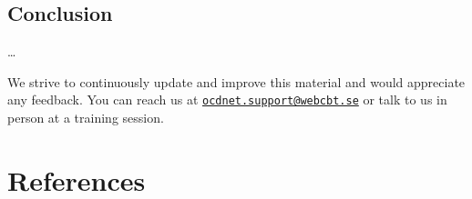 \documentclass[]{book}
\theoremstyle{definition}
\theoremstyle{definition}
\theoremstyle{definition}
\theoremstyle{remark}
\begin{document}
\hypertarget{conclusion}{%
\section{Conclusion}\label{conclusion}}

\ldots{}

We strive to continuously update and improve this material and would
appreciate any feedback. You can reach us at
\href{mailto:ocdnet.support@webcbt.se}{\nolinkurl{ocdnet.support@webcbt.se}}
or talk to us in person at a training session.

\hypertarget{references}{%
\chapter{References}\label{references}}


\end{document}
